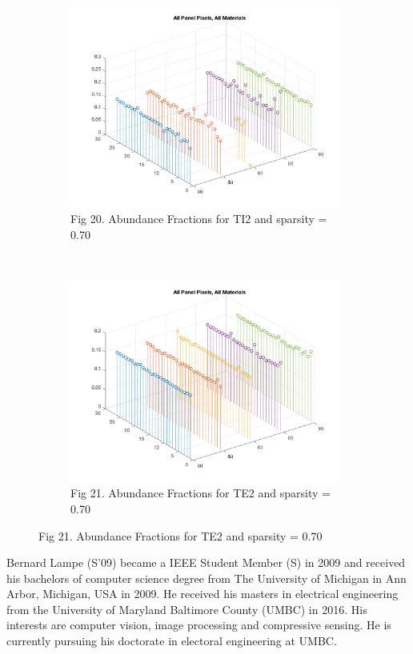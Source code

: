 \documentclass[journal]{IEEEtran}
\begin{document}
\begin{figure}[!t]
    \begin{subfigure}[b]{0.5\textwidth}
    \centering
    \includegraphics[width=3.5in]{nmf_abundance_ti2_70_allmaterials.png}
    \caption{Fig 20. Abundance Fractions for TI2 and sparsity = 0.70}
    \label{fig:nmf_abund_ti2_70}
    \end{subfigure}
~
    \begin{subfigure}[b]{0.5\textwidth}
    \centering
    \includegraphics[width=3.5in]{nmf_abundance_te2_70_allmaterials.png}
    \caption{Fig 21. Abundance Fractions for TE2 and sparsity = 0.70}
    \label{fig:nmf_abund_te2_70}
    \end{subfigure}
\end{figure}

\twocolumn

\nocite{*}



\begin{IEEEbiography}{Bernard Lampe}
 (S'09) became a IEEE Student Member (S) in 2009 and received his bachelors of computer science degree from The University of Michigan in Ann Arbor, Michigan, USA in 2009. He received his masters in electrical engineering from the University of Maryland Baltimore County (UMBC) in 2016. His interests are computer vision, image processing and compressive sensing. He is currently pursuing his doctorate in electoral engineering at UMBC.
\end{IEEEbiography}
\end{document}
